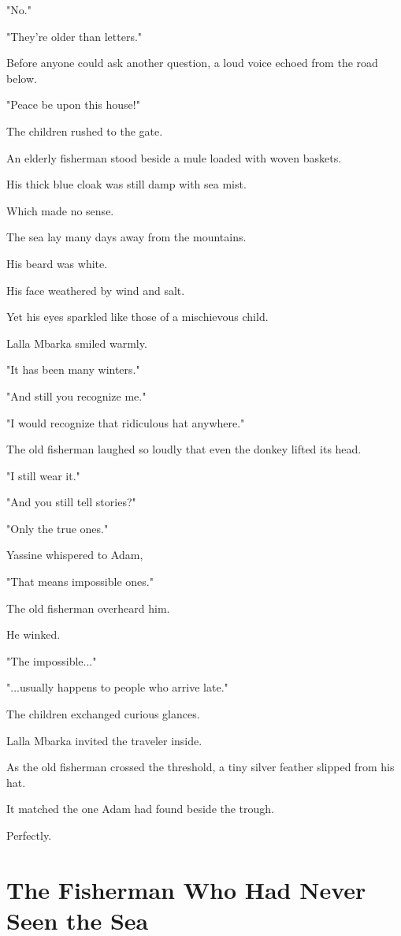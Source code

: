 \documentclass[12pt,openany]{book}
\begin{document}
"No."

"They're older than letters."

Before anyone could ask another question, a loud voice echoed from the road below.

"Peace be upon this house!"

The children rushed to the gate.

An elderly fisherman stood beside a mule loaded with woven baskets.

His thick blue cloak was still damp with sea mist.

Which made no sense.

The sea lay many days away from the mountains.

His beard was white.

His face weathered by wind and salt.

Yet his eyes sparkled like those of a mischievous child.

Lalla Mbarka smiled warmly.

"It has been many winters."

"And still you recognize me."

"I would recognize that ridiculous hat anywhere."

The old fisherman laughed so loudly that even the donkey lifted its head.

"I still wear it."

"And you still tell stories?"

"Only the true ones."

Yassine whispered to Adam,

"That means impossible ones."

The old fisherman overheard him.

He winked.

"The impossible..."

"...usually happens to people who arrive late."

The children exchanged curious glances.

Lalla Mbarka invited the traveler inside.

As the old fisherman crossed the threshold, a tiny silver feather slipped from his hat.

It matched the one Adam had found beside the trough.

Perfectly.
\section*{The Fisherman Who Had Never Seen the Sea}
\end{document}
